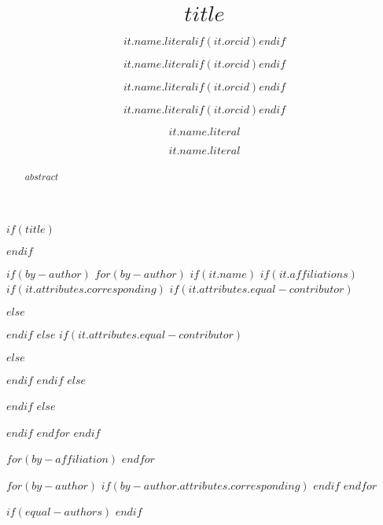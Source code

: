 $if(title)$
\title{$title$}
$endif$

$if(by-author)$
    $for(by-author)$
        $if(it.name)$
            $if(it.affiliations)$
                $if(it.attributes.corresponding)$
                    $if(it.attributes.equal-contributor)$
                        \author[$for(it.affiliations)$$it.number$$sep$,$endfor$*\dag]{$it.name.literal$$if(it.orcid)$$endif$}
                    $else$
                        \author[$for(it.affiliations)$$it.number$$sep$,$endfor$*]{$it.name.literal$$if(it.orcid)$$endif$}
                    $endif$
                $else$
                    $if(it.attributes.equal-contributor)$
                        \author[$for(it.affiliations)$$it.number$$sep$,$endfor$\dag]{$it.name.literal$$if(it.orcid)$$endif$}
                    $else$
                        \author[$for(it.affiliations)$$it.number$$sep$,$endfor$]{$it.name.literal$$if(it.orcid)$$endif$}
                    $endif$
                $endif$
            $else$
                \author[]{$it.name.literal$}
            $endif$
            $else$
            \author{$it.name.literal$}
        $endif$
    $endfor$
$endif$

$for(by-affiliation)$
$endfor$

$for(by-author)$
    $if(by-author.attributes.corresponding)$
    $endif$
$endfor$

$if(equal-authors)$
$endif$

\begin{abstract}
$abstract$
\end{abstract}